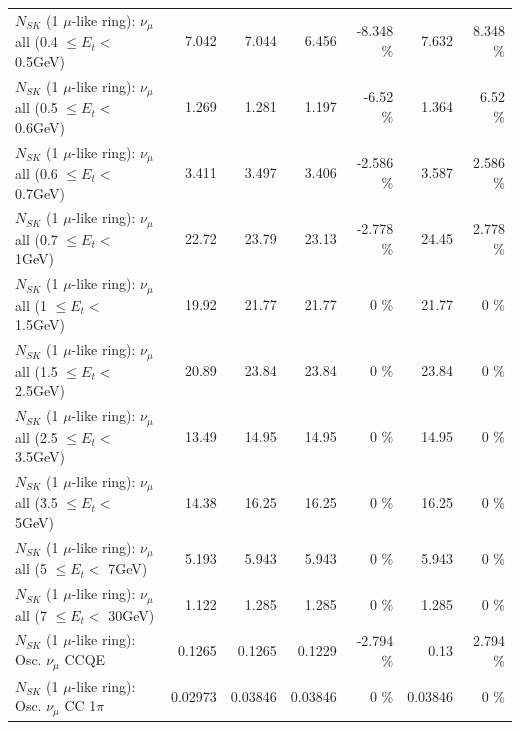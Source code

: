 \begin{table}
\begin{tabular}{| l | r | r | r  r | r  r |}
       $N_{SK}$ (1 $\mu$-like ring): $\nu_{\mu}$ all (0.4 $\leq E_{t} <$ 0.5GeV) &           7.042 &           7.044 &           6.456 &   -8.348 \%  &           7.632 &    8.348 \%  \\ 
       $N_{SK}$ (1 $\mu$-like ring): $\nu_{\mu}$ all (0.5 $\leq E_{t} <$ 0.6GeV) &           1.269 &           1.281 &           1.197 &    -6.52 \%  &           1.364 &     6.52 \%  \\ 
       $N_{SK}$ (1 $\mu$-like ring): $\nu_{\mu}$ all (0.6 $\leq E_{t} <$ 0.7GeV) &           3.411 &           3.497 &           3.406 &   -2.586 \%  &           3.587 &    2.586 \%  \\ 
         $N_{SK}$ (1 $\mu$-like ring): $\nu_{\mu}$ all (0.7 $\leq E_{t} <$ 1GeV) &           22.72 &           23.79 &           23.13 &   -2.778 \%  &           24.45 &    2.778 \%  \\ 
         $N_{SK}$ (1 $\mu$-like ring): $\nu_{\mu}$ all (1 $\leq E_{t} <$ 1.5GeV) &           19.92 &           21.77 &           21.77 &        0 \%  &           21.77 &        0 \%  \\ 
       $N_{SK}$ (1 $\mu$-like ring): $\nu_{\mu}$ all (1.5 $\leq E_{t} <$ 2.5GeV) &           20.89 &           23.84 &           23.84 &        0 \%  &           23.84 &        0 \%  \\ 
       $N_{SK}$ (1 $\mu$-like ring): $\nu_{\mu}$ all (2.5 $\leq E_{t} <$ 3.5GeV) &           13.49 &           14.95 &           14.95 &        0 \%  &           14.95 &        0 \%  \\ 
         $N_{SK}$ (1 $\mu$-like ring): $\nu_{\mu}$ all (3.5 $\leq E_{t} <$ 5GeV) &           14.38 &           16.25 &           16.25 &        0 \%  &           16.25 &        0 \%  \\ 
           $N_{SK}$ (1 $\mu$-like ring): $\nu_{\mu}$ all (5 $\leq E_{t} <$ 7GeV) &           5.193 &           5.943 &           5.943 &        0 \%  &           5.943 &        0 \%  \\ 
          $N_{SK}$ (1 $\mu$-like ring): $\nu_{\mu}$ all (7 $\leq E_{t} <$ 30GeV) &           1.122 &           1.285 &           1.285 &        0 \%  &           1.285 &        0 \%  \\ 
\hline
\hline
                               $N_{SK}$ (1 $\mu$-like ring): Osc. $\nu_\mu$ CCQE &          0.1265 &          0.1265 &          0.1229 &   -2.794 \%  &            0.13 &    2.794 \%  \\ 
                          $N_{SK}$ (1 $\mu$-like ring): Osc. $\nu_\mu$ CC 1$\pi$ &         0.02973 &         0.03846 &         0.03846 &        0 \%  &         0.03846 &        0 \%  \\ 

\end{tabular}
\end{table}
